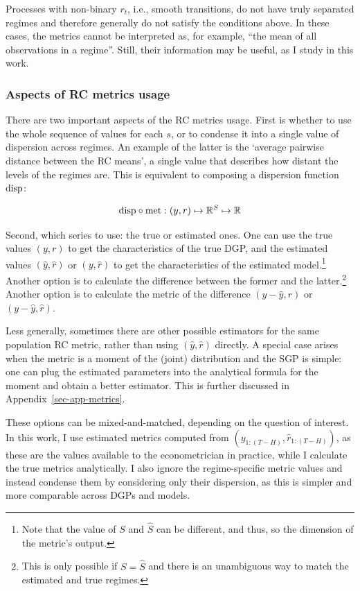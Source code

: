 \documentclass[
  letterpaper,
  DIV=11,
  numbers=noendperiod]{scrartcl}
\numberwithin{equation}{section}
\numberwithin{table}{section}
\numberwithin{figure}{section}
\begin{document}
Processes with non-binary \(r_t\), i.e., smooth transitions, do not have
truly separated regimes and therefore generally do not satisfy the
conditions above. In these cases, the metrics cannot be interpreted as,
for example, ``the mean of all observations in a regime''. Still, their
information may be useful, as I study in this work.

\subsubsection{Aspects of RC metrics usage}\label{sec-theory-usage}

There are two important aspects of the RC metrics usage. First is
whether to use the whole sequence of values for each \(s\), or to
condense it into a single value of dispersion across regimes. An example
of the latter is the `average pairwise distance between the RC means', a
single value that describes how distant the levels of the regimes are.
This is equivalent to composing a dispersion function \(\text{disp}\):

\begin{equation}
    \text{disp} \circ \text{met}: (y, r) \mapsto \mathbb{R}^{S} \mapsto \mathbb{R}
\end{equation}

Second, which series to use: the true or estimated ones. One can use the
true values \((y, r)\) to get the characteristics of the true DGP, and
the estimated values \((\hat{y}, \hat{r})\) or \((y, \hat{r})\) to get
the characteristics of the estimated model.\footnote{Note that the value
  of \(S\) and \(\hat{S}\) can be different, and thus, so the dimension
  of the metric's output.} Another option is to calculate the difference
between the former and the latter.\footnote{This is only possible if
  \(S = \hat{S}\) and there is an unambiguous way to match the estimated
  and true regimes.} Another option is to calculate the metric of the
difference \((y - \hat{y}, r)\) or \((y - \hat{y}, \hat{r})\).

Less generally, sometimes there are other possible estimators for the
same population RC metric, rather than using \((\hat{y}, \hat{r})\)
directly. A special case arises when the metric is a moment of the
(joint) distribution and the SGP is simple: one can plug the estimated
parameters into the analytical formula for the moment and obtain a
better estimator. This is further discussed in
Appendix~\ref{sec-app-metrics}.

These options can be mixed-and-matched, depending on the question of
interest. In this work, I use estimated metrics computed from
\((y_{1:(T-H)}, \hat{r}_{1:(T-H)})\), as these are the values available
to the econometrician in practice, while I calculate the true metrics
analytically. I also ignore the regime-specific metric values and
instead condense them by considering only their dispersion, as this is
simpler and more comparable across DGPs and models.
\end{document}
